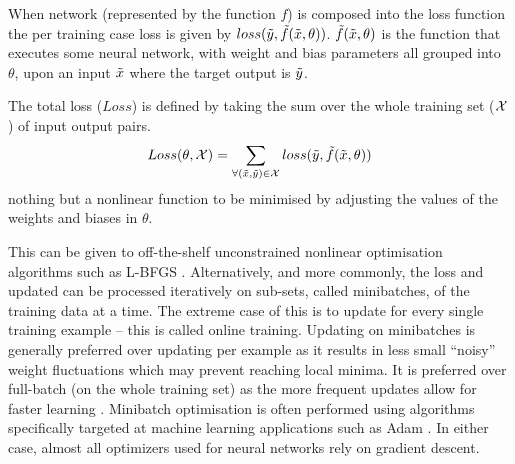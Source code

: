 \documentclass[12pt,parskip]{komatufte}
\begin{document}
When network (represented by the function $f$) is composed into the loss function
the per training case loss is given by $loss(\tilde{y}, \tilde{f}(\tilde{x},\theta))$.
$\tilde{f}(\tilde{x},\theta)$ is the function that executes some neural network, with weight and bias parameters all grouped into $\theta$, upon an input $\tilde{x}$ where the target output is $\tilde{y}$.

The total loss ($Loss$) is defined by taking the sum over the whole training set ($\mathcal{X}$) of input output pairs.
\begin{equation}
Loss(\theta, \mathcal{X}) = \sum_{\forall (\tilde{x}, \tilde{y})\in\mathcal{X}} loss(\tilde{y}, \tilde{f}(\tilde{x},\theta))
\label{equ:totalloss}
\end{equation}
 nothing but a nonlinear function to be minimised by adjusting the values of the weights and biases in $\theta$.


This can be given to off-the-shelf  unconstrained nonlinear optimisation algorithms  such as L-BFGS  \parencite{nocedal1980updating}.
Alternatively, and more commonly, the loss and updated can be processed iteratively on sub-sets, called minibatches, of the training data at a time.
The extreme case of this is to update for every single training example -- this is called online training.
Updating on minibatches is generally preferred over updating per example as it results in less small ``noisy'' weight fluctuations which may prevent reaching local minima.
It is preferred over full-batch (on the whole training set) as the more frequent updates allow for faster learning .
Minibatch optimisation is often performed using algorithms specifically targeted at machine learning applications such as Adam \parencite{kingma2014adam}.
In either case, almost all optimizers used for neural networks rely on gradient descent.

\end{document}
